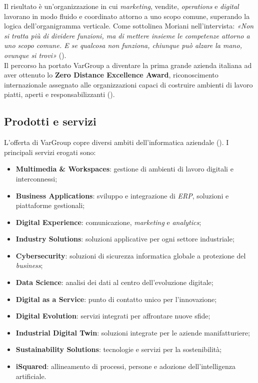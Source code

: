 Il risultato è un'organizzazione in cui \emph{marketing}, vendite, \emph{operations} e \emph{digital} lavorano in modo fluido e coordinato attorno a uno scopo comune, superando la logica dell'organigramma verticale. Come sottolinea Moriani nell'intervista: \emph{«Non si tratta più di dividere funzioni, ma di mettere insieme le competenze attorno a uno scopo comune. E se qualcosa non funziona, chiunque può alzare la mano, ovunque si trovi»} (\cite{site:industriaitaliana_vargroup}).\\

Il percorso ha portato VarGroup a diventare la prima grande azienda italiana ad aver ottenuto lo \textbf{Zero Distance Excellence Award}, riconoscimento internazionale assegnato alle organizzazioni capaci di costruire ambienti di lavoro piatti, aperti e responsabilizzanti (\cite {site:industriaitaliana_vargroup}).

\subsection{Prodotti e servizi}
 
L'offerta di VarGroup copre diversi ambiti dell'informatica aziendale (\cite{site:vargroup_services}). I principali servizi erogati sono:
 
\begin{itemize}
    \item \textbf{Multimedia \& Workspaces}: gestione di ambienti di lavoro digitali e interconnessi;
    \item \textbf{Business Applications}: sviluppo e integrazione di \emph{ERP}, soluzioni e piattaforme gestionali;
    \item \textbf{Digital Experience}: comunicazione, \emph{marketing} e \emph{analytics};
    \item \textbf{Industry Solutions}: soluzioni applicative per ogni settore industriale;
    \item \textbf{Cybersecurity}: soluzioni di sicurezza informatica globale a protezione del \emph{business};
    \item \textbf{Data Science}: analisi dei dati al centro dell'evoluzione digitale;
    \item \textbf{Digital as a Service}: punto di contatto unico per l'innovazione;
    \item \textbf{Digital Evolution}: servizi integrati per affrontare nuove sfide;
    \item \textbf{Industrial Digital Twin}: soluzioni integrate per le aziende manifatturiere;
    \item \textbf{Sustainability Solutions}: tecnologie e servizi per la sostenibilità;
    \item \textbf{iSquared}: allineamento di processi, persone e adozione dell'intelligenza artificiale.
\end{itemize}
 
